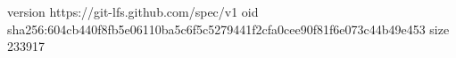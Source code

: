 version https://git-lfs.github.com/spec/v1
oid sha256:604cb440f8fb5e06110ba5c6f5c5279441f2cfa0cee90f81f6e073c44b49e453
size 233917
